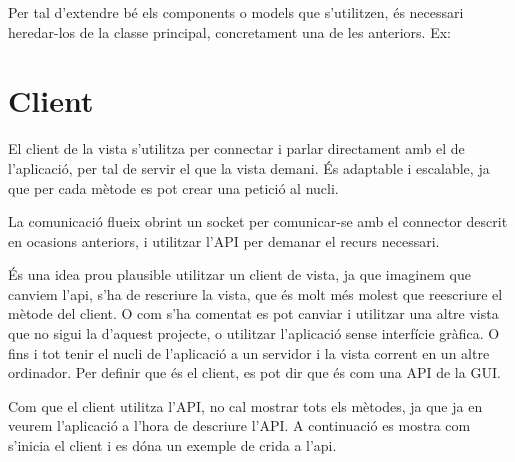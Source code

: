 \documentclass[letterpaper,11pt,catalan]{sphinxmanual}
\begin{document}
Per tal d'extendre bé els components o models que s'utilitzen, és necessari heredar-los
de la classe principal, concretament una de les anteriors. Ex: 


\section{Client}
\label{\detokenize{index:client}}
El client de la vista s'utilitza per connectar i parlar directament amb el  de l'aplicació,
per tal de servir el que la vista demani. És adaptable i escalable, ja que per cada mètode es pot crear una petició al nucli.

La comunicació flueix obrint un socket per comunicar-se amb el connector descrit en ocasions anteriors, i
utilitzar l'API per demanar el recurs necessari.

És una idea prou plausible utilitzar un client de vista, ja que imaginem que canviem l'api,
s'ha de rescriure la vista, que és molt més molest que reescriure el mètode del client.
O com s'ha comentat es pot canviar i utilitzar una altre vista que no sigui la d'aquest
projecte, o utilitzar l'aplicació sense interfície gràfica. O fins i tot tenir el nucli
de l'aplicació a un servidor i la vista corrent en un altre ordinador.
Per definir que és el client, es pot dir que és com una API de la GUI.

Com que el client utilitza l'API, no cal mostrar tots els mètodes, ja que ja en veurem
l'aplicació a l'hora de descriure l'API. A continuació es mostra com s'inicia el client
i es dóna un exemple de crida a l'api.
\end{document}
